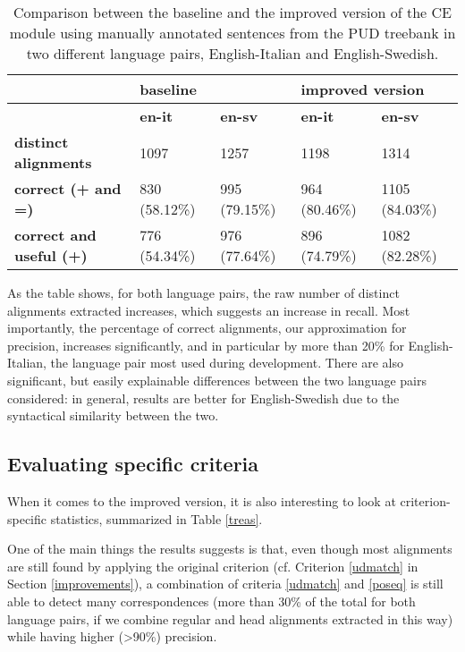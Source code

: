 \begin{table}[h]
 \centering
 \footnotesize
 \begin{tabular}{|l|l|l|l|l|}
 \hline
   & \multicolumn{2}{l|}{\textbf{baseline}} & \multicolumn{2}{l|}{\textbf{improved version}} \\ \hline
 \textbf{}   & \textbf{en-it}  & \textbf{en-sv} & \textbf{en-it}  & \textbf{en-sv} \\ \hline
 \textbf{distinct alignments} & 1097  & 1257 & 1198   & 1314  \\ \hline
 \textbf{correct (+ and =)} & 830 (58.12\%) & 995 (79.15\%)  & 964 (80.46\%) & 1105 (84.03\%) \\ \hline
 \textbf{correct and useful (+)} & 776 (54.34\%) & 976 (77.64\%)  & 896 (74.79\%) & 1082 (82.28\%) \\ \hline
 \end{tabular}
 \caption[Comparison between the baseline and the improved version of the CE on manually annotated data]{Comparison between the baseline and the improved version of the CE module using manually annotated sentences from the PUD treebank in two different language pairs, English-Italian and English-Swedish.}
 \label{tbase}
 \end{table}

As the table shows, for both language pairs, the raw number of distinct alignments extracted increases, which suggests an increase in recall. Most importantly, the percentage of correct alignments, our approximation for precision, increases significantly, and in particular by more than 20\% for English-Italian, the language pair most used during development. 
There are also significant, but easily explainable differences between the two language pairs considered: in general, results are better for English-Swedish due to the syntactical similarity between the two. \smallskip

\subsection{Evaluating specific criteria}
When it comes to the improved version, it is also interesting to look at criterion-specific statistics, summarized in Table \ref{treas}. \smallskip

One of the main things the results suggests is that, even though most alignments are still found by applying the original criterion (cf. Criterion \ref{udmatch} in Section \ref{improvements}), a combination of criteria \ref{udmatch} and \ref{poseq} is still able to detect many correspondences (more than 30\% of the total for both language pairs, if we combine regular and head alignments extracted in this way) while having higher (>90\%) precision. \smallskip

